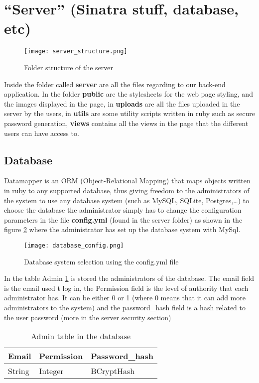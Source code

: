 \section{``Server'' (Sinatra stuff, database, etc)}

\begin{figure}[htb]
\centering
\texttt{[image: server\_structure.png]}
\caption{Folder structure of the server}
\label{fig:server_structure}
\end{figure}

  Inside the folder called {\bf server} are all the files regarding to our back-end application. In the folder {\bf public} are the stylesheets for the web page styling, and the images
displayed in the page, in {\bf uploads} are all the files uploaded in the server by the users, in {\bf utils} are some utility scripts written in ruby such as secure password generation,
{\bf views} contains all the views in the page that the different users can have access to.

\subsection{Database}

  Datamapper is an ORM (Object-Relational Mapping) that maps objects written in ruby to any supported database, thus giving freedom to the administrators of the system to use any database system (such as
MySQL, SQLite, Postgres,\ldots) to choose the database the administrator simply has to change the configuration parameters in the file {\bf config.yml} (found in the server folder) as shown in the
figure \ref{fig:database_config} where the administrator has set up the database system with MySql.

\begin{figure}[htb]
\centering
\texttt{[image: database\_config.png]}
\caption{Database system selection using the config.yml file}
\label{fig:database_config}
\end{figure}

In the table Admin \ref{tab:admin_table} is stored the administrators of the database. The email field is the email used t log in,
the Permission field is the level of authority that each administrator has. It can be either 0 or 1 (where 0 means that it can add
more administrators to the system) and the password\_hash field is a hash related to the user password (more in the server security section)
\begin{table}
\centering
    \begin{tabular}{ | l | l | l |}
    \hline
    Email & Permission & Password\_hash  \\ \hline
    String & Integer & BCryptHash \\ \hline
    \end{tabular}
    \caption{Admin table in the database}
    \label{tab:admin_table}
\end{table}

